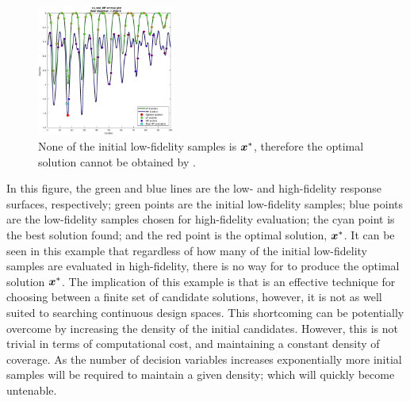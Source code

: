\begin{figure}[h!]
  \centering
  \includegraphics[width = 0.40\textwidth]{img/ex_motos.eps} 
  \caption{None of the initial low-fidelity samples is $\boldsymbol{x}^*$, therefore the optimal solution cannot be obtained by \motos{}.} 
    \label{fig:motos-example}
\end{figure}
In this figure, the green and blue lines are the low- and high-fidelity response surfaces, respectively; green points are the initial low-fidelity samples; blue points are the low-fidelity samples chosen for high-fidelity evaluation; the cyan point is the best solution found; and the red point is the optimal solution, $\boldsymbol{x}^*$. It can be seen in this example that regardless of how many of the initial low-fidelity samples are evaluated in high-fidelity, there is no way for \motos{} to produce the optimal solution $\boldsymbol{x}^*$. The implication of this example is that \motos{} is an effective technique for choosing between a finite set of candidate solutions, however, it is not as well suited to searching continuous design spaces. This shortcoming can be potentially overcome by increasing the density of the initial candidates. However, this is not trivial in terms of computational cost, and maintaining a constant density of coverage. As the number of decision variables increases exponentially more initial samples will be required to maintain a given density; which will quickly become untenable.
